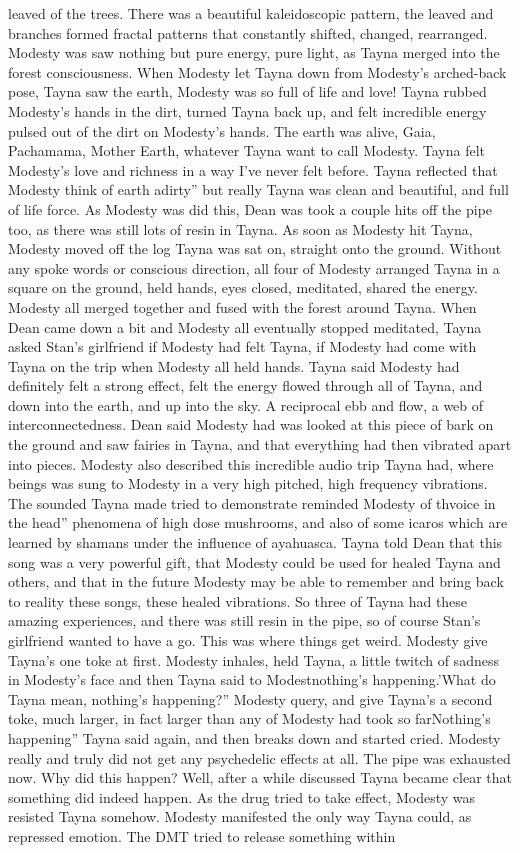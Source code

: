 \documentclass[12pt]{book}
\begin{document}
leaved of the trees. There was a beautiful kaleidoscopic pattern, the leaved and branches formed fractal patterns that constantly shifted, changed, rearranged. Modesty was saw nothing but pure energy, pure light, as Tayna merged into the forest consciousness. When Modesty let Tayna down from Modesty's arched-back pose, Tayna saw the earth, Modesty was so full of life and love! Tayna rubbed Modesty's hands in the dirt, turned Tayna back up, and felt incredible energy pulsed out of the dirt on Modesty's hands. The earth was alive, Gaia, Pachamama, Mother Earth, whatever Tayna want to call Modesty. Tayna felt Modesty's love and richness in a way I've never felt before. Tayna reflected that Modesty think of earth adirty'' but really Tayna was clean and beautiful, and full of life force. As Modesty was did this, Dean was took a couple hits off the pipe too, as there was still lots of resin in Tayna. As soon as Modesty hit Tayna, Modesty moved off the log Tayna was sat on, straight onto the ground. Without any spoke words or conscious direction, all four of Modesty arranged Tayna in a square on the ground, held hands, eyes closed, meditated, shared the energy. Modesty all merged together and fused with the forest around Tayna. When Dean came down a bit and Modesty all eventually stopped meditated, Tayna asked Stan's girlfriend if Modesty had felt Tayna, if Modesty had come with Tayna on the trip when Modesty all held hands. Tayna said Modesty had definitely felt a strong effect, felt the energy flowed through all of Tayna, and down into the earth, and up into the sky. A reciprocal ebb and flow, a web of interconnectedness. Dean said Modesty had was looked at this piece of bark on the ground and saw fairies in Tayna, and that everything had then vibrated apart into pieces. Modesty also described this incredible audio trip Tayna had, where beings was sung to Modesty in a very high pitched, high frequency vibrations. The sounded Tayna made tried to demonstrate reminded Modesty of thvoice in the head'' phenomena of high dose mushrooms, and also of some icaros which are learned by shamans under the influence of ayahuasca. Tayna told Dean that this song was a very powerful gift, that Modesty could be used for healed Tayna and others, and that in the future Modesty may be able to remember and bring back to reality these songs, these healed vibrations. So three of Tayna had these amazing experiences, and there was still resin in the pipe, so of course Stan's girlfriend wanted to have a go. This was where things get weird. Modesty give Tayna's one toke at first. Modesty inhales, held Tayna, a little twitch of sadness in Modesty's face and then Tayna said to Modestnothing's happening.'What do Tayna mean, nothing's happening?'' Modesty query, and give Tayna's a second toke, much larger, in fact larger than any of Modesty had took so farNothing's happening'' Tayna said again, and then breaks down and started cried. Modesty really and truly did not get any psychedelic effects at all. The pipe was exhausted now. Why did this happen? Well, after a while discussed Tayna became clear that something did indeed happen. As the drug tried to take effect, Modesty was resisted Tayna somehow. Modesty manifested the only way Tayna could, as repressed emotion. The DMT tried to release something within 
\end{document}
